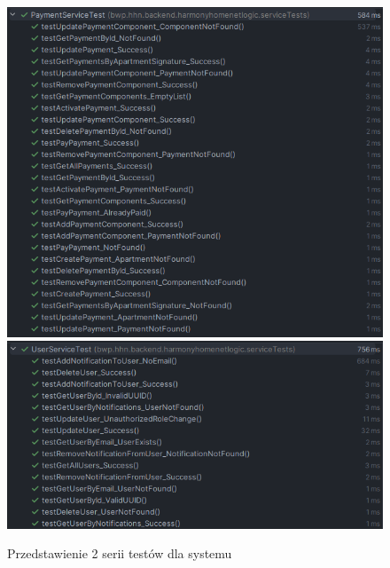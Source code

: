 \begin{figure}[htb]
	\centering
		\includegraphics[width=0.91\linewidth]{rys03/testy/platnosci_testy} \\[-1ex]
		\includegraphics[width=0.91\linewidth]{rys03/testy/user_testy} \\[-1ex]
		\caption{Przedstawienie 2 serii testów dla systemu}
	\label{fig:test_presetation}
\end{figure}

